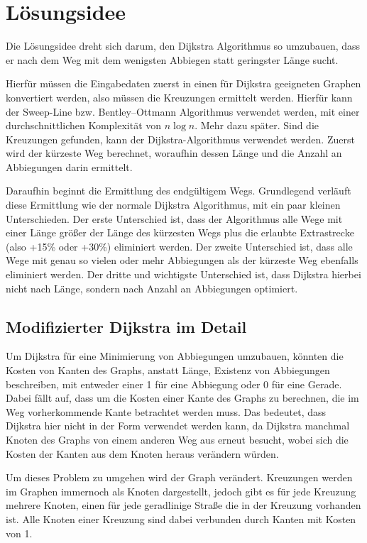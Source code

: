 \documentclass{article}
\theoremstyle{nonumberplain}
\begin{document}
    
\section{Lösungsidee}

Die Lösungsidee dreht sich darum, den Dijkstra Algorithmus so umzubauen, dass er nach dem Weg mit dem wenigsten Abbiegen statt geringster Länge sucht.

Hierfür müssen die Eingabedaten zuerst in einen für Dijkstra geeigneten Graphen konvertiert werden, also müssen die Kreuzungen ermittelt werden.
Hierfür kann der Sweep-Line bzw. Bentley–Ottmann Algorithmus verwendet werden, mit einer durchschnittlichen Komplexität von \(n \log n\). Mehr dazu später.
Sind die Kreuzungen gefunden, kann der Dijkstra-Algorithmus verwendet werden.
Zuerst wird der kürzeste Weg berechnet, woraufhin dessen Länge und die Anzahl an Abbiegungen darin ermittelt.

Daraufhin beginnt die Ermittlung des endgültigem Wegs.
Grundlegend verläuft diese Ermittlung wie der normale Dijkstra Algorithmus, mit ein paar kleinen Unterschieden.
Der erste Unterschied ist, dass der Algorithmus alle Wege mit einer Länge größer der Länge des kürzesten Wegs plus die erlaubte Extrastrecke (also +15\% oder +30\%) eliminiert werden.
Der zweite Unterschied ist, dass alle Wege mit genau so vielen oder mehr Abbiegungen als der kürzeste Weg ebenfalls eliminiert werden.
Der dritte und wichtigste Unterschied ist, dass Dijkstra hierbei nicht nach Länge, sondern nach Anzahl an Abbiegungen optimiert.

\subsection{Modifizierter Dijkstra im Detail}

Um Dijkstra für eine Minimierung von Abbiegungen umzubauen, könnten die Kosten von Kanten des Graphs, anstatt Länge, Existenz von Abbiegungen beschreiben, mit entweder einer 1 für eine Abbiegung oder 0 für eine Gerade. 
Dabei fällt auf, dass um die Kosten einer Kante des Graphs zu berechnen, die im Weg vorherkommende Kante betrachtet werden muss.
Das bedeutet, dass Dijkstra hier nicht in der Form verwendet werden kann, da Dijkstra manchmal Knoten des Graphs von einem anderen Weg aus erneut besucht, wobei sich die Kosten der Kanten aus dem Knoten heraus verändern würden.

Um dieses Problem zu umgehen wird der Graph verändert.
Kreuzungen werden im Graphen immernoch als Knoten dargestellt, jedoch gibt es für jede Kreuzung mehrere Knoten, einen für jede geradlinige Straße die in der Kreuzung vorhanden ist.
Alle Knoten einer Kreuzung sind dabei verbunden durch Kanten mit Kosten von 1.
\end{document}
